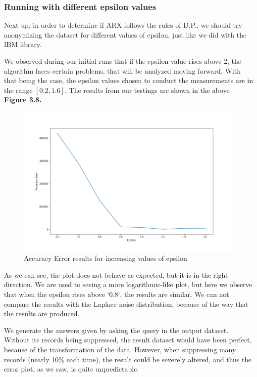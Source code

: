 \subsubsection{Running with different epsilon values}

Next up, in order to determine if ARX follows the rules of D.P., we should try anonymizing the dataset for different values of epsilon, just like we did with the IBM library.

We observed during our initial runs that if the epsilon value rises above 2, the algorithm faces certain problems, that will be analyzed moving forward. With that being the case, the epsilon values chosen to conduct the measurements are in the range $[0.2, 1.6]$. The results from our testings are shown in the above \textbf{Figure 3.8.}

\begin{figure}[!htb]\centering
    \includegraphics[width=1\textwidth]{images/arx_accuracy.png}
    \caption{Accuracy Error results for increasing values of epsilon}
\end{figure}

As we can see, the plot does not behave as expected, but it is in the right direction. We are used to seeing a more logarithmic-like plot, but here we observe that when the epsilon rises above `0.8`, the results are similar. We can not compare the results with the Laplace noise distribution, because of the way that the results are produced. 

We generate the answers given by asking the query in the output dataset. Without its records being suppressed, the result dataset would have been perfect, because of the transformation of the data. However, when suppressing many records (nearly 10\% each time), the result could be severely altered, and thus the error plot, as we saw, is quite unpredictable.


